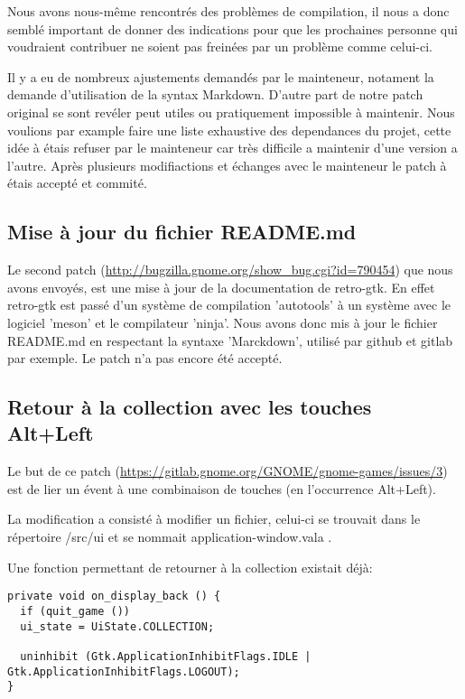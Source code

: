 \documentclass[12pt]{report}
\begin{document}
Nous avons nous-même rencontrés des problèmes de compilation, il nous a donc
semblé important de donner des indications pour que les prochaines personne qui
voudraient contribuer ne soient pas freinées par un problème comme celui-ci.

Il y a eu de nombreux ajustements demandés par le mainteneur, notament la demande
d'utilisation de la syntax Markdown. D'autre part de notre patch original se sont
revéler peut utiles ou pratiquement impossible à maintenir. Nous voulions par
example faire une liste exhaustive des dependances du projet, cette idée à étais
refuser par le mainteneur car très difficile a maintenir d'une version a l'autre.
Après plusieurs modifiactions et échanges avec le mainteneur le patch à étais
accepté et commité.

\subsection{Mise à jour du fichier README.md}
\label{README}
Le second patch (\url{http://bugzilla.gnome.org/show_bug.cgi?id=790454}) 
que nous avons envoyés, est une mise à jour de la documentation de retro-gtk.
En effet retro-gtk est passé d'un système de compilation 'autotools' à un
système avec le logiciel 'meson' et le compilateur 'ninja'.
Nous avons donc mis à jour le fichier README.md en respectant la syntaxe
'Marckdown', utilisé par github et gitlab par exemple.
Le patch n'a pas encore été accepté.

\subsection{Retour à la collection avec les touches Alt+Left}
Le but de ce patch (\url{https://gitlab.gnome.org/GNOME/gnome-games/issues/3})
est de lier un évent à une combinaison de touches (en l’occurrence Alt+Left).

La modification a consisté à modifier un fichier, celui-ci se trouvait
dans le répertoire /src/ui et se nommait application-window.vala .

Une fonction permettant de retourner à la collection existait déjà:

\begin{verbatim}
private void on_display_back () {
  if (quit_game ())
  ui_state = UiState.COLLECTION;

  uninhibit (Gtk.ApplicationInhibitFlags.IDLE | Gtk.ApplicationInhibitFlags.LOGOUT);
}
\end{verbatim}
\end{document}
